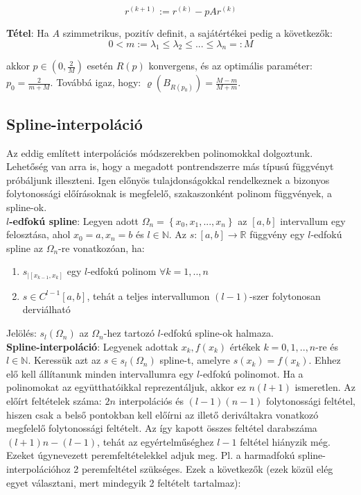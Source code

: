 \documentclass[margin=0px]{article}
\begin{document}
\begin{displaymath}
    r^{(k+1)} := r^{(k)} - pAr^{(k)}
\end{displaymath}

\noindent \textbf{Tétel}: Ha $A$ szimmetrikus, pozitív definit, a sajátértékei pedig a következők:
\begin{displaymath}
    0 < m := \lambda_{1} \leq \lambda_{2} \leq ... \leq \lambda_{n} =: M
\end{displaymath}

\noindent akkor $p \in (0,\frac{2}{M})$ esetén $R(p)$ konvergens, és az optimális paraméter: $p_{0} = \frac{2}{m + M}$.
Továbbá igaz, hogy: $\varrho(B_{R(p_{0})}) = \frac{M - m}{M + m}$.

\subsection{Spline-interpoláció}

Az eddig említett interpolációs módszerekben polinomokkal dolgoztunk. Lehetőség van arra is, hogy a megadott pontrendszerre más
típusú függvényt próbáljunk illeszteni. Igen előnyös tulajdonságokkal rendelkeznek a bizonyos folytonossági előírásoknak is
megfelelő, szakaszonként polinom függvények, a spline-ok.\\

\noindent \textbf{$l$-edfokú spline}: Legyen adott $\Omega_{n} = \left\{x_{0}, x_{1}, ..., x_{n}\right\}$ az $[a,b]$ intervallum egy
felosztása, ahol $x_{0}=a, x_{n}=b$ és $l \in \mathbb{N}$. Az $s:[a,b] \to \mathbb{R}$ függvény egy $l$-edfokú spline az
$\Omega_{n}$-re vonatkozóan, ha:

\begin{enumerate}
    \item	$s_{|[x_{k-1},x_{k}]}$ egy $l$-edfokú polinom $\forall k = 1,..,n$

    \item	$s \in C^{l-1}[a,b]$, tehát a teljes intervallumon $(l-1)$-szer folytonosan derviálható
\end{enumerate}

\noindent Jelölés: $s_{l}(\Omega_{n})$ az $\Omega_{n}$-hez tartozó $l$-edfokú spline-ok halmaza.\\

\noindent \textbf{Spline-interpoláció}: Legyenek adottak $x_{k},f(x_{k})$ értékek $k=0,1,..,n$-re és $l \in \mathbb{N}$.
Keressük azt az $s \in s_{l}(\Omega_{n})$ spline-t, amelyre $s(x_{k}) = f(x_{k})$. Ehhez elő kell állítanunk minden
intervallumra egy $l$-edfokú polinomot. Ha a polinomokat az együtthatóikkal reprezentáljuk, akkor ez $n(l+1)$ ismeretlen.
Az előírt feltételek száma: $2n$ interpolációs és $(l-1)(n-1)$ folytonossági feltétel, hiszen csak a belső pontokban kell
előírni az illető deriváltakra vonatkozó megfelelő folytonossági feltételt. Az így kapott összes feltétel darabszáma
$(l+1)n - (l-1)$, tehát az egyértelműséghez $l-1$ feltétel hiányzik még. Ezeket úgynevezett peremfeltételekkel adjuk meg.
Pl. a harmadfokú spline-interpolációhoz 2 peremfeltétel szükséges. Ezek a következők (ezek közül elég egyet választani,
mert mindegyik 2 feltételt tartalmaz):
\end{document}
